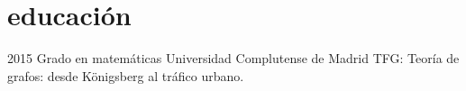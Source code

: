 \documentclass[]{friggeri-cv}
\begin{document}
\section{educación}

\begin{entrylist}
  \entry
    {2015}
    {Grado en matemáticas}
    {Universidad Complutense de Madrid}
    {TFG: Teoría de grafos: desde Königsberg al tráfico urbano.}
\end{entrylist}







\fi
\end{document}
